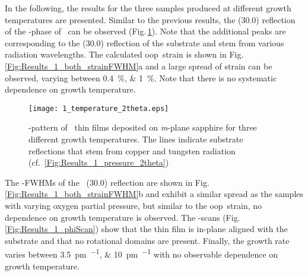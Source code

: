 In the following, the results for the three samples produced at different growth temperatures are presented.
Similar to the previous results, the (30.0) reflection of the \textalpha-phase of \cro\ can be observed (Fig.\,\ref{Fig:Results_1_temperature_2theta}).
Note that the additional peaks are corresponding to the (30.0) reflection of the substrate and stem from various radiation wavelengths.
The calculated \gls{oop}\ strain is shown in Fig.\,\ref{Fig:Results_1_both_strainFWHM}a and a large spread of strain can be observed, varying between \qtylist{0.4;1}{\percent}.
Note that there is no systematic dependence on growth temperature.
\begin{figure}
    \centering
    \texttt{[image: 1\_temperature\_2theta.eps]}
    \caption{
        \thetaomega-pattern of \cro\ thin films deposited on \textit{m}-plane sapphire for three different growth temperatures.
        The lines indicate substrate reflections that stem from copper and tungsten radiation (cf.~\ref{Fig:Results_1_pressure_2theta})
    }
    \label{Fig:Results_1_temperature_2theta}
\end{figure}
The \textomega-FWHMs of the \cro\ (30.0) reflection are shown in Fig.\,\ref{Fig:Results_1_both_strainFWHM}b and exhibit a similar spread as the samples with varying oxygen partial pressure, but similar to the \gls{oop}\ strain, no dependence on growth temperature is observed.
The \textphi-scans (Fig.\,\ref{Fig:Results_1_phiScan}) show that the thin film is in-plane aligned with the substrate and that no rotational domains are present.
Finally, the growth rate varies between \qtylist{3.5;10}{\pm\per\pulse} with no observable dependence on growth temperature.